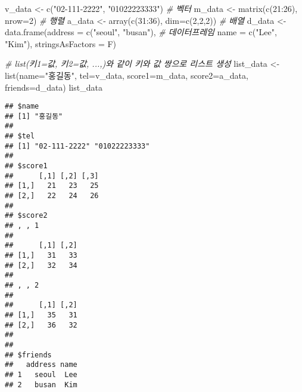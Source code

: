 \documentclass[
]{article}
\newenvironment{Shaded}{\begin{snugshade}}{\end{snugshade}}
\newcommand{\AttributeTok}[1]{\textcolor[rgb]{0.77,0.63,0.00}{#1}}
\newcommand{\CommentTok}[1]{\textcolor[rgb]{0.56,0.35,0.01}{\textit{#1}}}
\newcommand{\DecValTok}[1]{\textcolor[rgb]{0.00,0.00,0.81}{#1}}
\newcommand{\FunctionTok}[1]{\textcolor[rgb]{0.00,0.00,0.00}{#1}}
\newcommand{\NormalTok}[1]{#1}
\newcommand{\OtherTok}[1]{\textcolor[rgb]{0.56,0.35,0.01}{#1}}
\newcommand{\SpecialCharTok}[1]{\textcolor[rgb]{0.00,0.00,0.00}{#1}}
\newcommand{\StringTok}[1]{\textcolor[rgb]{0.31,0.60,0.02}{#1}}
\begin{document}
\begin{Shaded}
\begin{Highlighting}[]
\NormalTok{v\_data }\OtherTok{\textless{}{-}} \FunctionTok{c}\NormalTok{(}\StringTok{"02{-}111{-}2222"}\NormalTok{, }\StringTok{"01022223333"}\NormalTok{)            }\CommentTok{\# 벡터}
\NormalTok{m\_data }\OtherTok{\textless{}{-}} \FunctionTok{matrix}\NormalTok{(}\FunctionTok{c}\NormalTok{(}\DecValTok{21}\SpecialCharTok{:}\DecValTok{26}\NormalTok{), }\AttributeTok{nrow=}\DecValTok{2}\NormalTok{)                   }\CommentTok{\# 행렬}
\NormalTok{a\_data }\OtherTok{\textless{}{-}} \FunctionTok{array}\NormalTok{(}\FunctionTok{c}\NormalTok{(}\DecValTok{31}\SpecialCharTok{:}\DecValTok{36}\NormalTok{), }\AttributeTok{dim=}\FunctionTok{c}\NormalTok{(}\DecValTok{2}\NormalTok{,}\DecValTok{2}\NormalTok{,}\DecValTok{2}\NormalTok{))              }\CommentTok{\# 배열}
\NormalTok{d\_data }\OtherTok{\textless{}{-}} \FunctionTok{data.frame}\NormalTok{(}\AttributeTok{address =} \FunctionTok{c}\NormalTok{(}\StringTok{"seoul"}\NormalTok{, }\StringTok{"busan"}\NormalTok{),  }\CommentTok{\# 데이터프레임}
                     \AttributeTok{name =} \FunctionTok{c}\NormalTok{(}\StringTok{"Lee"}\NormalTok{, }\StringTok{"Kim"}\NormalTok{), }\AttributeTok{stringsAsFactors =}\NormalTok{ F)}

\CommentTok{\# list(키1=값, 키2=값, ...,)와 같이 키와 값 쌍으로 리스트 생성}
\NormalTok{list\_data }\OtherTok{\textless{}{-}} \FunctionTok{list}\NormalTok{(}\AttributeTok{name=}\StringTok{"홍길동"}\NormalTok{,}
                  \AttributeTok{tel=}\NormalTok{v\_data,}
                  \AttributeTok{score1=}\NormalTok{m\_data,}
                  \AttributeTok{score2=}\NormalTok{a\_data,}
                  \AttributeTok{friends=}\NormalTok{d\_data)}
\NormalTok{list\_data}
\end{Highlighting}
\end{Shaded}

\begin{verbatim}
## $name
## [1] "홍길동"
## 
## $tel
## [1] "02-111-2222" "01022223333"
## 
## $score1
##      [,1] [,2] [,3]
## [1,]   21   23   25
## [2,]   22   24   26
## 
## $score2
## , , 1
## 
##      [,1] [,2]
## [1,]   31   33
## [2,]   32   34
## 
## , , 2
## 
##      [,1] [,2]
## [1,]   35   31
## [2,]   36   32
## 
## 
## $friends
##   address name
## 1   seoul  Lee
## 2   busan  Kim
\end{verbatim}

\begin{Shaded}
\end{Shaded}
\end{document}
